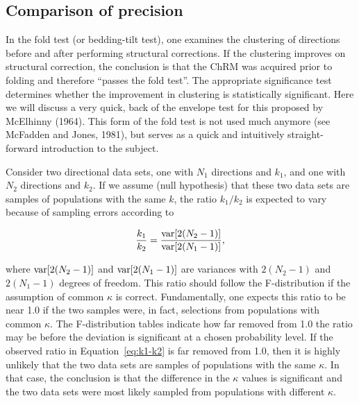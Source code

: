 \subsection{Comparison of precision } 

In the 
fold test (or bedding-tilt test), one examines the clustering of directions before and after performing
structural corrections. If the clustering improves on structural correction, the conclusion is that the ChRM
was acquired prior to folding and therefore ``passes the fold test''. The appropriate significance test determines
whether the improvement in clustering is statistically significant.  Here we will discuss a very quick, back of the envelope test for this proposed by 
McElhinny (1964).     \nocite{mcelhinny64}This form of the fold test is not used much anymore (see 
McFadden and Jones, 1981), \nocite{mcfadden81} but serves as a quick and intuitively straight-forward introduction to the subject.  

Consider two directional data sets, one with $N_1$ directions and $k_1$, and one with $N_2$ directions and $k_2$. If
we assume (null hypothesis) that these two data sets are samples of populations with the same $k$, the ratio
$k_1 / k_2$ is expected to vary because of sampling errors according to

\begin{equation}
{ k_1 \over {k_2}} = {  { \hbox{var} [2(N_2 -1)]} \over { \hbox{var} [ 2(N_1 -1)]}},
\label{eq:k1-k2}
\end{equation}

\noindent where $\hbox{var} [2(N_2 -1)]$ and $\hbox{var} [2(N_1 -1)]$ are variances with $2(N_2-1)$ and $2(N_1-1)$ degrees of freedom.  This ratio should follow the F-distribution if the assumption of common $\kappa$  is correct. Fundamentally, one expects
this ratio to be near 1.0 if the two samples were, in fact, selections from populations with common $\kappa$. The
F-distribution tables indicate how far removed from 1.0 the ratio may be before the deviation is significant at
a chosen probability level. If the observed ratio in Equation~\ref{eq:k1-k2}  is far removed from 1.0, then it is highly
unlikely that the two data sets are samples of populations with the same $\kappa$. In that case, the conclusion is
that the difference in the $\kappa$ values is significant and the two data sets were most likely sampled from populations
with different $\kappa$.


